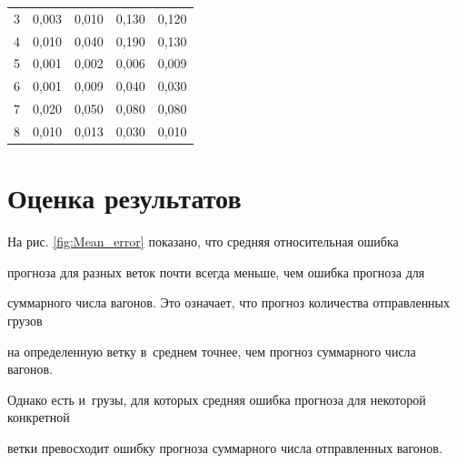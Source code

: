 \begin{table}[h]
\begin{center}
\begin{tabular}{|c|c|c|c|c|}
        3 &  0,003 & 0,010& 0,130& 0,120\\


        4 &  0,010& 0,040& 0,190& 0,130\\


        5 &  0,001& 0,002& 0,006& 0,009\\


        6 &  0,001 & 0,009& 0,040& 0,030\\


        7 &  0,020&  0,050 & 0,080& 0,080\\


        8 & 0,010 & 0,013& 0,030& 0,010\\


    \hline


    \end{tabular}


\end{center}


\vspace*{-12pt}


\end{table}








\vspace*{-6pt}





\section{Оценка результатов}





На рис. \ref{fig:Mean_error} показано, что средняя относительная ошибка


прогноза для разных веток почти всегда меньше, чем ошибка прогноза для


суммарного числа вагонов. Это означает, что прогноз количества отправленных грузов


на определенную ветку в~среднем точнее, чем прогноз суммарного числа вагонов.


Однако есть и~грузы, для которых средняя ошибка прогноза для некоторой конкретной


ветки превосходит ошибку прогноза суммарного числа отправленных вагонов.





